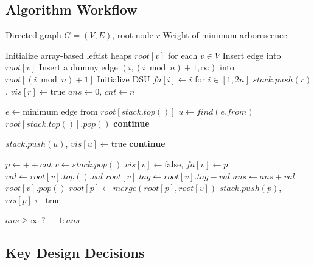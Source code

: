\documentclass[UTF8, a4paper]{article}
\theoremstyle{definition}
\begin{document}
\subsection{Algorithm Workflow}

\begin{algorithm}[H]
\caption{Tarjan's $O(E \log V)$ DMST Algorithm with Stack and Dummy Edges}
\label{alg:dmst}
\begin{algorithmic}[1]
\Require Directed graph $G=(V, E)$, root node $r$
\Ensure Weight of minimum arborescence

\State Initialize array-based leftist heaps $root[v]$ for each $v \in V$
    \State Insert edge into $root[v]$
\EndFor
{}
    \State Insert a dummy edge $(i, (i \bmod n) + 1, \infty)$ into $root[(i \bmod n) + 1]$
\EndFor
\State Initialize DSU $fa[i] \gets i$ for $i \in [1, 2n]$
\State $stack.push(r)$, $vis[r] \gets \text{true}$
\State $ans \gets 0$, $cnt \gets n$

    \State $e \gets \text{minimum edge from } root[stack.top()]$
    \State $u \gets find(e.from)$
        \State $root[stack.top()].pop()$ 
        \State \textbf{continue}
    \EndIf
    
        \State $stack.push(u)$, $vis[u] \gets \text{true}$ 
        \State \textbf{continue}
    \EndIf
    
    \State $p \gets ++cnt$ 
        \State $v \gets stack.pop()$
        \State $vis[v] \gets \text{false}$, $fa[v] \gets p$
        \State $val \gets root[v].top().val$
        \State $root[v].tag \gets root[v].tag - val$ 
            \State $ans \gets ans + val$ 
        \EndIf
        \State $root[v].pop()$ 
        \State $root[p] \gets merge(root[p], root[v])$
    \EndWhile
    \State $stack.push(p)$, $vis[p] \gets \text{true}$
\EndWhile

\State \Return $ans \geq \infty \;\mathbf{?}\; -1 : ans$
\end{algorithmic}
\end{algorithm}

\subsection{Key Design Decisions}
\end{document}

